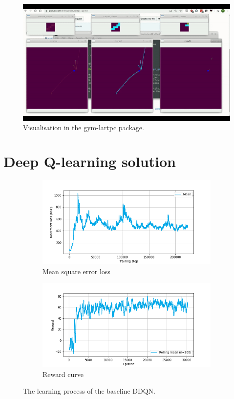 \begin{figure}[H]
\centering
\includegraphics[width=\textwidth]{figures/chapter7/lartpc_visual.png}
\caption{Visualisation in the gym-lartpc package.}
\label{fig:lartpc-visual}
\end{figure}

\section{Deep Q-learning solution}
\begin{figure}
\begin{subfigure}{.45\textwidth}
  \centering
  \includegraphics[width=1.2\linewidth]{figures/chapter7/loss.png}
  \caption{Mean square error loss}
  \label{fig:rl_loss}
\end{subfigure}%
\hspace{1em}%
\begin{subfigure}{.45\textwidth}
  \centering
  \includegraphics[width=1.2\linewidth]{figures/chapter7/reward.png}
  \caption{Reward curve}
  \label{fig:rl_reward}
\end{subfigure}
\caption{The learning process of the baseline DDQN.  }
\label{fig:rl_learning}
\end{figure}

